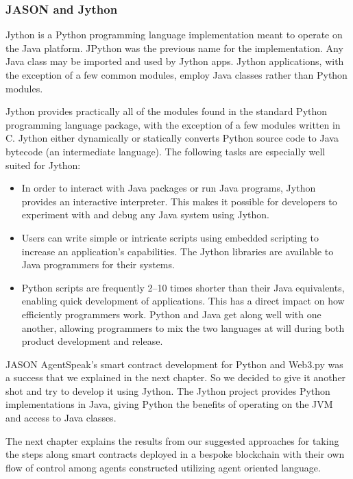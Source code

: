 \subsubsection{JASON and Jython}


Jython is a Python programming language implementation meant to operate on the Java platform. JPython was the previous name for the implementation. Any Java class may be imported and used by Jython apps. Jython applications, with the exception of a few common modules, employ Java classes rather than Python modules. 

\vspace{.5cm}
Jython provides practically all of the modules found in the standard Python programming language package, with the exception of a few modules written in C. Jython either dynamically or statically converts Python source code to Java bytecode (an intermediate language). The following tasks are especially well suited for Jython:

\begin{itemize}
    \item In order to interact with Java packages or run Java programs, Jython provides an interactive interpreter. This makes it possible for developers to experiment with and debug any Java system using Jython.
    \vspace{.5cm}
    \item Users can write simple or intricate scripts using embedded scripting to increase an application's capabilities. The Jython libraries are available to Java programmers for their systems.
    \vspace{.5cm}
     \item Python scripts are frequently 2–10 times shorter than their Java equivalents, enabling quick development of applications. This has a direct impact on how efficiently programmers work. Python and Java get along well with one another, allowing programmers to mix the two languages at will during both product development and release.
\end{itemize}

\vspace{.5cm}

JASON AgentSpeak's smart contract development for Python and Web3.py was a success that we explained in the next chapter. So we decided to give it another shot and try to develop it using Jython. The Jython project provides Python implementations in Java, giving Python the benefits of operating on the JVM and access to Java classes.

\vspace{.5cm}

The next chapter explains the results from our suggested approaches for taking the steps along smart contracts deployed in a bespoke blockchain with their own flow of control among agents constructed utilizing agent oriented language.

